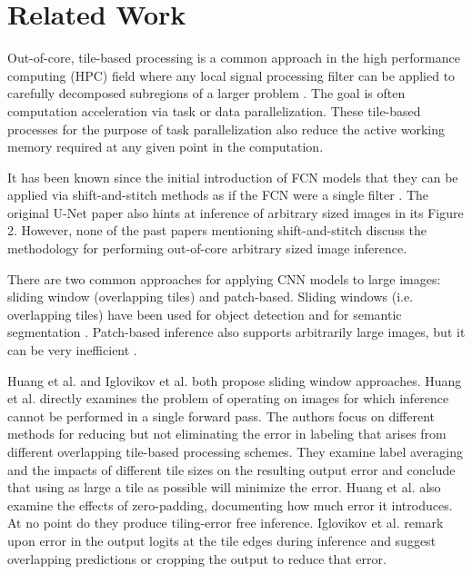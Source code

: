 \documentclass[10pt, indentfirst]{article}
\begin{document}
\section{Related Work}
\label{related-work}

Out-of-core, tile-based processing is a common approach in the high performance computing (HPC) field where any local signal processing filter can be applied to carefully decomposed subregions of a larger problem \citep{Blattner2017}.
The goal is often computation acceleration via task or data parallelization.
These tile-based processes for the purpose of task parallelization also reduce the active working memory required at any given point in the computation.

It has been known since the initial introduction of FCN models that they can be applied via shift-and-stitch methods as if the FCN were a single filter \citep{Long2015,Sherrah2016}.
The original U-Net paper \citep{Ronneberger2015a} also hints at inference of arbitrary sized images in its Figure 2.
However, none of the past papers mentioning shift-and-stitch discuss the methodology for performing out-of-core arbitrary sized image inference.

There are two common approaches for applying CNN models to large images: sliding window (overlapping tiles) and patch-based.
Sliding windows (i.e. overlapping tiles) have been used for object detection \citep{Sermanet2013,VanEtten2019} and for semantic segmentation \citep{Lin2019,Volpi2017a}.
Patch-based inference also supports arbitrarily large images, but it can be very inefficient \citep{Volpi2017a,Maggiori2016}.

Huang et al. and Iglovikov et al. \citep{Huang2019a,Iglovikov2017} both propose sliding window approaches.
Huang et al. \citep{Huang2019a} directly examines the problem of operating on images for which inference cannot be performed in a single forward pass.
The authors focus on different methods for reducing but not eliminating the error in labeling that arises from different overlapping tile-based processing schemes.
They examine label averaging and the impacts of different tile sizes on the resulting output error and conclude that using as large a tile as possible will minimize the error.
Huang et al. \citep{Huang2019a} also examine the effects of zero-padding, documenting how much error it introduces.
At no point do they produce tiling-error free inference.
Iglovikov et al. \citep{Iglovikov2017} remark upon error in the output logits at the tile edges during inference and suggest overlapping predictions or cropping the output to reduce that error.
\end{document}
